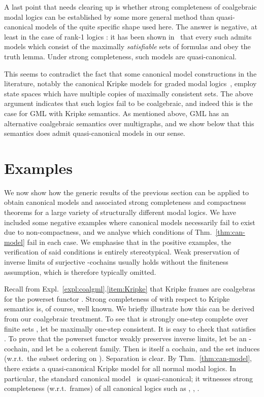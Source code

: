 \documentclass[proceedings]{stacs}
\theoremstyle{definition}
\theoremstyle{plain}
\begin{document}
\begin{rem}
  A last point that needs clearing up is whether strong completeness
  of coalgebraic modal logics can be established by some more general
  method than quasi-canonical models of the quite specific shape used
  here. The answer is negative, at least in the case of rank-1 logics
  : it has been shown in~\cite{KurzPattinson05} that every such
   admits models which consist of the maximally
  \emph{satisfiable} sets of formulas and obey the truth lemma. Under
  strong completeness, such models are quasi-canonical.

  This seems to contradict the fact that some canonical model
  constructions in the literature, notably the canonical Kripke models
  for graded modal logics~\cite{Fine72,DeCaro88}, employ state spaces
  which have multiple copies of maximally consistent sets.  The above
  argument indicates that such logics fail to be coalgebraic, and
  indeed this is the case for GML with Kripke
  semantics. As mentioned above, GML has an alternative
  coalgebraic semantics over multigraphs, and we show below that this
  semantics does admit quasi-canonical models in our sense.
\end{rem}

\section{Examples}\label{sec:examples}

\noindent We now show how the generic results of the previous section
can be applied to obtain canonical models and associated strong
completeness and compactness theorems for a large variety of
structurally different modal logics. We have included some negative
examples where canonical models necessarily fail to exist due to
non-compactness, and we analyse which conditions of
Thm.~\ref{thm:can-model} fail in each case. We emphasise that in
the positive examples, the verification of said conditions is entirely
stereotypical. Weak preservation of inverse limits of surjective
-cochains usually holds without the finiteness assumption,
which is therefore typically omitted.

\begin{exa}
Recall from Expl.~\ref{expl:coalgml}.\ref{item:Kripke} that Kripke
  frames are coalgebras for the powerset functor .
  Strong completeness of  with respect to Kripke semantics is, of
  course, well known.  We briefly illustrate how this can be derived
  from our coalgebraic treatment.  To see that  is strongly
  one-step complete over finite sets , let
   be maximally one-step
  consistent. It is easy to check that  satisfies .  To prove that the
  powerset functor weakly preserves inverse limits, let  be an
  -cochain, and let  be a coherent
  family. Then  is itself a cochain, and the set  induces  (w.r.t.\ the subset
  ordering on ). Separation is clear. By
  Thm.~\ref{thm:can-model}, there exists a quasi-canonical Kripke
  model for all normal modal logics.  In particular, the standard
  canonical model~\cite{Chellas80} is quasi-canonical; it witnesses
  strong completeness (w.r.t.\ frames) of all canonical logics such as
  , , .
\end{exa}
\end{document}
